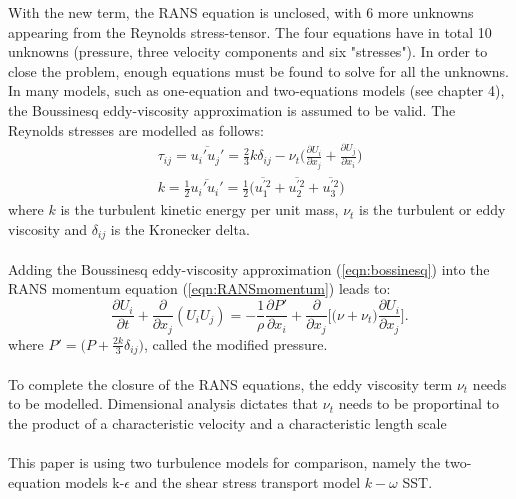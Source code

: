 \documentclass[a4paper, 12pt]{report}
\begin{document}
With the new term, the RANS equation is unclosed, with 6 more unknowns appearing from the Reynolds stress-tensor. The four equations have in total 10 unknowns (pressure, three velocity components and six "stresses"). In order to close the problem, enough equations must be found to solve for all the unknowns. In many models, such as one-equation and two-equations models (see \citep{Wilcox} chapter 4), the Boussinesq eddy-viscosity approximation \citep{CFD} is assumed to be valid. The Reynolds stresses are modelled as follows:
\begin{eqnarray}
\label{eqn:bossinesq}
\tau_{ij} = \overline{u_i'u_j'} = \frac{2}{3}k\delta_{ij} - \nu_t\big(\frac{\partial U_i}{\partial x_j} + \frac{\partial U_j}{\partial x_i}\big)\\
\label{eqn:TurbKineticEnergy}
k = \frac{1}{2}\overline{u_i' u_i'} = \frac{1}{2}\big(\overline{u_1^{'2}} + \overline{u_2^{'2}} + \overline{u_3^{'2}} \big)
\end{eqnarray}
where $k$ is the turbulent kinetic energy per unit mass, $\nu_t$ is the turbulent or eddy viscosity and $\delta_{ij}$ is the Kronecker  delta.\\
\\
Adding the Boussinesq eddy-viscosity approximation (\ref{eqn:bossinesq}) into the RANS momentum equation (\ref{eqn:RANSmomentum}) leads to:
\begin{equation}
\frac{\partial U_i}{\partial t} +  \frac{\partial}{\partial x_j}(U_i U_j) = -\frac{1}{\rho} \frac{\partial P'}{\partial x_i} +  \frac{\partial}{\partial x_j}\Big[ \big(\nu + \nu_t\big) \frac{\partial U_i}{\partial x_j}\Big].
\end{equation}
where $P' = \big(P + \frac{2k}{3}\delta_{ij} \big)$, called the modified pressure\cite{Pope}.\\
\\
To complete the closure of the RANS equations, the eddy viscosity term $\nu_t$ needs to be modelled. Dimensional analysis dictates that $\nu_t$ needs to be proportinal to the product of a characteristic velocity and a characteristic length scale \cite{Wilcox,AppliedMathematicalModelling}\\
\\
This paper is using two turbulence models for comparison, namely the two-equation models k-$\epsilon$ and the shear stress transport model $k-\omega$ SST.
\end{document}
